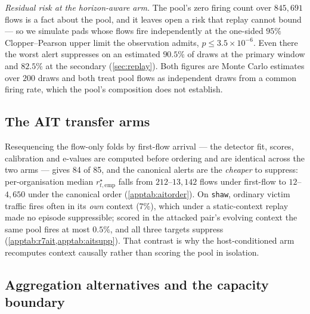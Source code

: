 \documentclass[conference]{IEEEtran}
\begin{document}


\emph{Residual risk at the horizon-aware arm.} The pool's zero firing count over $845{,}691$ flows is
a fact about the pool, and it leaves open a risk that replay cannot bound --- so we simulate pads
whose flows fire independently at the one-sided $95\%$ Clopper--Pearson upper limit the observation
admits, $p\le3.5\times10^{-6}$. Even there the worst alert suppresses on an estimated $90.5\%$ of
draws at the primary window and $82.5\%$ at the secondary (\cref{sec:replay}). Both figures are Monte
Carlo estimates over $200$ draws and both treat pool flows as independent draws from a common firing
rate, which the pool's composition does not establish.

\subsection{The AIT transfer arms}\label{app:ait}



Resequencing the flow-only folds by first-flow arrival --- the detector fit, scores, calibration and
e-values are computed before ordering and are identical across the two arms --- gives 84 of 85, and the
canonical alerts are the \emph{cheaper} to suppress: per-organisation median $r^{\star}_{t,\mathrm{emp}}$ falls from
$212$--$13{,}142$ flows under first-flow to $12$--$4{,}650$ under the canonical order
(\cref{apptab:aitorder}). On \texttt{shaw}, ordinary victim traffic fires often in its \emph{own}
context (7\%), which under a static-context replay made no episode suppressible; scored in the attacked
pair's evolving context the same pool fires at most $0.5\%$, and all three targets suppress
(\cref{apptab:r7ait,apptab:aitsupp}). That contrast is why the host-conditioned arm recomputes context
causally rather than scoring the pool in isolation.









\subsection{Aggregation alternatives and the capacity boundary}\label{app:defences}
\end{document}
